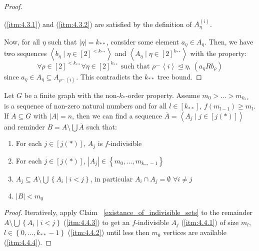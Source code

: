 \begin{proof}
\begin{itemize}
                (\ref{itm:4.3.1}) and (\ref{itm:4.3.2}) are satisfied by the definition of $A_\eta^{(i)}$.
        \end{itemize}
        Now, for all $\eta$ such that $|\eta| = k_{**}$, consider some element $a_\eta \in A_\eta$.
        Then, we have two sequences $\left< b_\eta \mid \eta \in [2]^{<k_{**}} \right>$ and $\left< A_\eta \mid \eta \in [2]^{k_{**}} \right>$
            with the property:
        \[
            \forall \rho \in [2]^{<k_{**}} \forall \eta \in [2]^{k_{**}} \text{ such that } \rho^\frown \left< i \right> \trianglelefteq
                \eta \text{, } (a_\eta R b_\rho)
        \]
            since $a_\eta \in A_\eta \subseteq A_{\rho ^\frown \left< i \right>}$.
        This contradicts the $k_{**}$ tree bound.
        \end{proof}

    \lemma[Claim 4.4]\label{existance_of_f_indivisible_partitions}
    Let $G$ be a finite graph with the non-$k_{*}$-order property.
    Assume $m_0 > \dots > m_{k_{**}}$ is a sequence of non-zero natural numbers and for all $l \in [k_{**}]$, $f(m_{l-1}) \geq m_l$.
    If $A \subseteq G$ with $|A| = n$, then we can find a sequence $\overline{A} = \left< A_j \mid j \in [j(*)] \right>$
        and reminder $B = A \setminus \bigcup \overline{A}$ such that:
    \begin{enumerate}
        \item \label{itm:4.4.1} For each $j \in [j(*)]$, $A_j$ is $f$-indivisible
        \item \label{itm:4.4.2} For each $j \in [j(*)]$, $|A_j| \in \left\{ m_0, \dots, m_{k_{**}-1} \right\}$
        \item \label{itm:4.4.3} $A_j \subseteq A \setminus \bigcup\left\{ A_i \mid i < j \right\}$, in particular $A_i \cap A_j = \emptyset$ $\forall i \neq j$
        \item \label{itm:4.4.4} $|B| < m_0$
    \end{enumerate}
        \begin{proof}
        Iteratively, apply Claim ~\ref{existance_of_indivisible_sets} to the remainder $A \setminus \bigcup \left\{ A_i \mid i < j \right\}$
            (\ref{itm:4.4.3}) to get an $f$-indivisible $A_j$ (\ref{itm:4.4.1}) of size $m_l$, $l \in \left\{ 0, \dots, k_{**}-1 \right\}$
            (\ref{itm:4.4.2}) until less then $m_0$ vertices are available (\ref{itm:4.4.4}).
        \end{proof}

